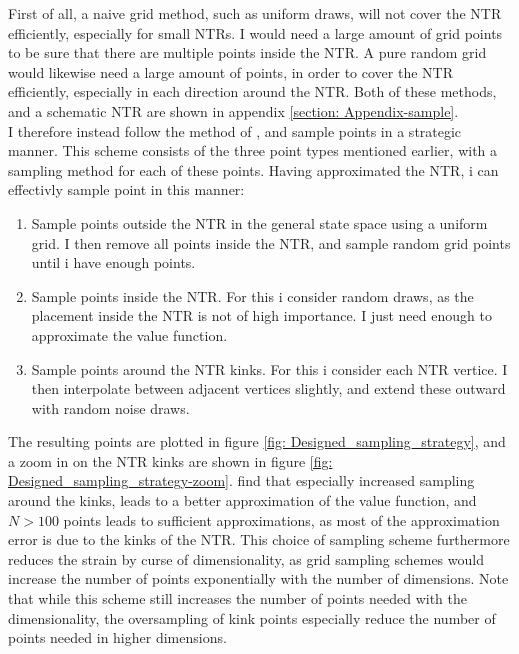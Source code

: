 \documentclass[11pt]{article}
\begin{document}
First of all, a naive grid method, such as uniform draws, will not cover the \ac{NTR} efficiently, especially for small \ac{NTR}s.
I would need a large amount of grid points to be sure that there are multiple points inside the NTR.
A pure random grid would likewise need a large amount of points, in order to cover the \ac{NTR} efficiently, especially in each direction around the NTR.
Both of these methods, and a schematic \ac{NTR} are shown in appendix \ref{section: Appendix-sample}.\\
I therefore instead follow the method of \autocite{Scheidegger2023}, and sample points in a strategic manner.
This scheme consists of the three point types mentioned earlier, with a sampling method for each of these points.
Having approximated the \ac{NTR}, i can effectivly sample point in this manner:
\begin{enumerate}
  \item Sample points outside the \ac{NTR} in the general state space using a uniform grid. I then remove all points inside the \ac{NTR}, and sample random grid points until i have enough points.
  \item Sample points inside the \ac{NTR}. For this i consider random draws, as the placement inside the NTR is not of high importance. I just need enough to approximate the value function.
  \item Sample points around the \ac{NTR} kinks. For this i consider each \ac{NTR} vertice. I then interpolate between adjacent vertices slightly, and extend these outward with random noise draws. 
\end{enumerate}
The resulting points are plotted in figure \ref{fig: Designed_sampling_strategy}, and a zoom in on the \ac{NTR} kinks are shown in figure \ref{fig: Designed_sampling_strategy-zoom}.
\autocite{Scheidegger2023} find that especially increased sampling around the kinks, leads to a better approximation of the value function,
and $N>100$ points leads to sufficient approximations, as most of the approximation error is due to the kinks of the \ac{NTR}.
This choice of sampling scheme furthermore reduces the strain by curse of dimensionality, as grid sampling schemes would increase the number of points exponentially with the number of dimensions.
Note that while this scheme still increases the number of points needed with the dimensionality, the oversampling of kink points especially reduce the number of points needed in higher dimensions.
\end{document}
